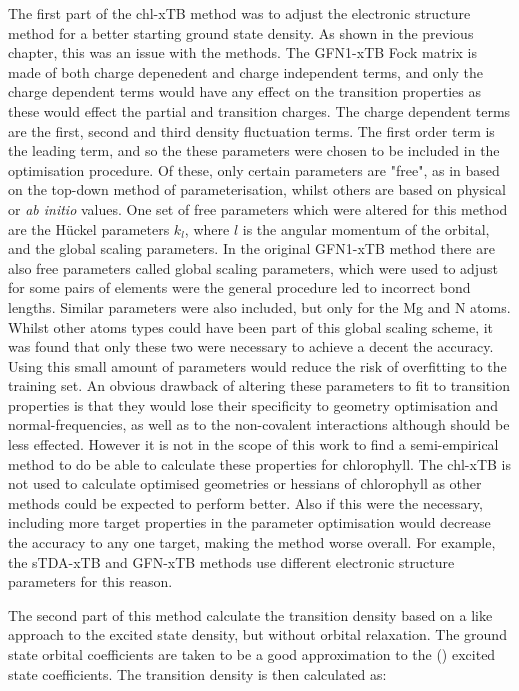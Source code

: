 The first part of the chl-xTB method was to adjust the electronic structure method
for a better starting ground state density. As shown in the previous chapter, this
was an issue with the \dxtb methods. The GFN1-xTB Fock matrix is made of both charge
depenedent and charge independent terms, and only the charge dependent terms would
have any effect on the transition properties as these would effect the partial and
transition charges. The charge dependent terms are the first, second and third 
density fluctuation terms. The first order term is the leading term, and so the 
these parameters were chosen to be included in the optimisation procedure. Of these,
only certain parameters are "free", as in based on the top-down method of parameterisation,
whilst others are based on physical or \emph{ab initio} values. One set of free parameters 
which were altered for this method are the H{\"u}ckel parameters $k_l$, where $l$
is the angular momentum of the orbital, and the global scaling parameters. In the
original GFN1-xTB method there are also free parameters called global scaling 
parameters, which were used to adjust for some pairs of elements were the general
procedure led to incorrect bond lengths. Similar parameters were also included, but
only for the Mg and N atoms. Whilst other atoms types could have been part of this
global scaling scheme, it was found that only these two were necessary to achieve
a decent the accuracy. Using this small amount of parameters would reduce the risk
of overfitting to the training set.
An obvious drawback of altering these parameters to fit to transition properties
is that they would lose their specificity to geometry optimisation and normal-frequencies,
as well as to the non-covalent interactions although should be less effected. However
it is not in the scope of this work to find a semi-empirical method to do be able
to calculate these properties for chlorophyll. The chl-xTB is not used to calculate
optimised geometries or hessians of chlorophyll as other methods could be expected 
to perform better. Also if this were the necessary, including more target properties
in the parameter optimisation would decrease the accuracy to any one target, making
the method worse overall. For example, the sTDA-xTB and GFN-xTB methods use different
electronic structure parameters for this reason.

The second part of this method calculate the transition density based on a \dscf
like approach to the excited state density, but without orbital relaxation. The
ground state orbital coefficients are taken to be a good approximation to the
(\Qy) excited state coefficients. The transition density is then calculated as:

